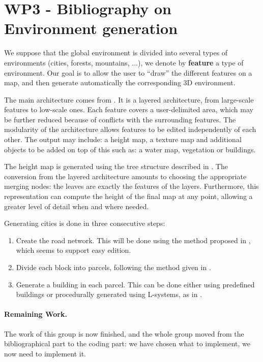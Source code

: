 \section{WP3 - Bibliography on Environment generation}
\label{WP3}


We suppose that the global environment is divided into several types of environments (cities, forests, mountains, ...), we denote by \textbf{feature} a type of environment. Our goal is to allow the user to ``draw'' the different features on a map, and then generate automatically the corresponding 3D environment.

The main architecture comes from \cite{DeclarativeArchitecture}. It is a layered architecture, from large-scale features to low-scale ones. Each feature covers a user-delimited area, which may be further reduced because of conflicts with the surrounding features. The modularity of the architecture allows features to be edited independently of each other. The output may include: a height map, a texture map and additional objects to be added on top of this such as: a water map, vegetation or buildings.

The height map is generated using the tree structure described in \cite{FeatureTree}. The conversion from the layered architecture amounts to choosing the appropriate merging nodes: the leaves are exactly the features of the layers. Furthermore, this representation can compute the height of the final map at any point, allowing a greater level of detail when and where needed.

Generating cities is done in three consecutive steps:
\begin{enumerate}
\item Create the road network. This will be done using the method proposed in \cite{StreetTensors}, which seems to support easy edition.
  
\item Divide each block into parcels, following the method given in \cite{PGParcels}.
  
\item Generate a building in each parcel. This can be done either using predefined buildings or procedurally generated using L-systems, as in \cite{FLSystem}.
\end{enumerate}


\paragraph{Remaining Work.} The work of this group is now finished, and the whole group moved from the bibliographical part to the coding part: we have chosen what to implement, we now need to implement it.
